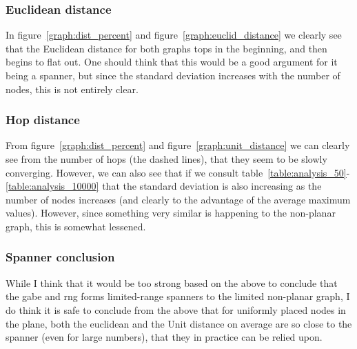 \subsubsection{Euclidean distance}

In figure~\ref{graph:dist_percent} and figure~\ref{graph:euclid_distance} we clearly see that the Euclidean distance for both graphs tops in the beginning, and then begins to flat out. One should think that this would be a good argument for it being a spanner, but since the standard deviation increases with the number of nodes, this is not entirely clear.

\subsubsection{Hop distance}


From figure~\ref{graph:dist_percent} and figure~\ref{graph:unit_distance} we can clearly see from the number of hops (the dashed lines), that they seem to be slowly converging. However, we can also see that if we consult table~\ref{table:analysis_50}-\ref{table:analysis_10000} that the standard deviation is also increasing as the number of nodes increases (and clearly to the advantage of the average maximum values). However, since something very similar is happening to the non-planar graph, this is somewhat lessened.

\subsubsection{Spanner conclusion}

While I think that it would be too strong based on the above to conclude that the \ac{gabe} and \ac{rng} forms limited-range spanners to the limited non-planar graph, I do think it is safe to conclude from the above that for uniformly placed nodes in the plane, both the euclidean and the Unit distance on average are so close to the spanner (even for large numbers), that they in practice can be relied upon.

\subsection{}
